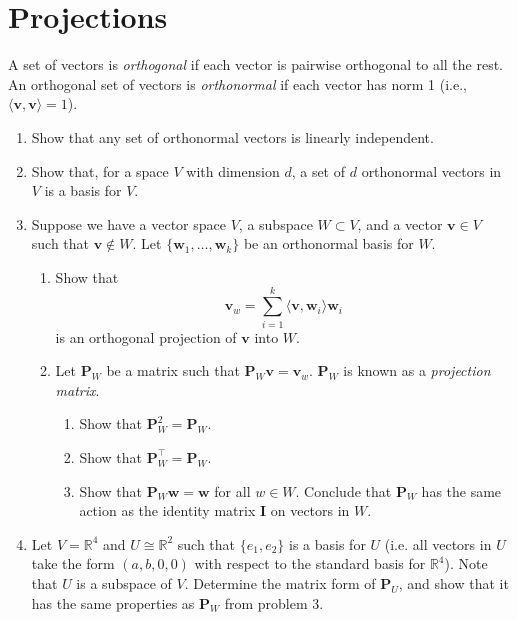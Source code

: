 \documentclass{article}
\begin{document}
\section{Projections}
A set of vectors is \textit{orthogonal} if each vector is pairwise orthogonal to all the rest. An orthogonal set of vectors is \textit{orthonormal} if each vector has norm 1 (i.e., $\langle \mathbf{v}, \mathbf{v} \rangle = 1$).
\begin{enumerate}[label=\arabic*.]
	\item Show that any set of orthonormal vectors is linearly independent. 
	\item Show that, for a space $V$ with dimension $d$, a set of $d$ orthonormal vectors in $V$ is a basis for $V$.
	\item Suppose we have a vector space $V$, a subspace $W \subset V$, and a vector $\mathbf{v} \in V$ such that $\mathbf{v} \notin W$. Let $\{\mathbf{w}_1, \ldots, \mathbf{w}_k\}$ be an orthonormal basis for $W$. 
	\begin{enumerate}[label=(\alph*)]
	\item Show that $$\mathbf{v}_w = \sum\limits_{i=1}^k \langle \mathbf{v}, \mathbf{w}_i \rangle\mathbf{w}_i$$ is an orthogonal projection of $\mathbf{v}$ into $W$.
	\item Let $\mathbf{P}_W$ be a matrix such that $\mathbf{P}_W\mathbf{v} = \mathbf{v}_w$. $\mathbf{P}_W$ is known as a \textit{projection matrix}.
	\begin{enumerate}[label=\roman*.]
	\item Show that $\mathbf{P}_W^2 = \mathbf{P}_W$.
	\item Show that $\mathbf{P}_W^{\top} = \mathbf{P}_W$.
	\item Show that $\mathbf{P}_W\mathbf{w} = \mathbf{w}$ for all $w \in W$. Conclude that $\mathbf{P}_W$ has the same action as the identity matrix $\mathbf{I}$ on vectors in $W$.
	\end{enumerate}
	\end{enumerate}
	\item Let $V = \mathbb{R}^4$ and $U \cong \mathbb{R}^2$ such that $\{e_1, e_2\}$ is a basis for $U$ (i.e. all vectors in $U$ take the form $(a, b, 0, 0)$ with respect to the standard basis for $\mathbb{R}^4$). Note that $U$ is a subspace of $V$. Determine the matrix form of $\mathbf{P}_{U}$, and show that it has the same properties as $\mathbf{P}_W$ from problem 3.
\end{enumerate}
\end{document}
